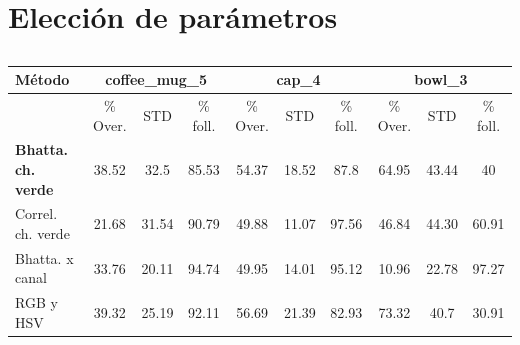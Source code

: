 \section{Elección de parámetros}\label{eleccion_parametros}
\begin{table}[h]
    \begin{tabular}{|l|*{3}{c|}*{3}{c|}*{3}{c|}}
        \hline 
	    Método & \multicolumn{3}{|c|}{coffee\_mug\_5} & \multicolumn{3}{|c|}{cap\_4} & \multicolumn{3}{|c|}{bowl\_3}\\
	    \hline 
         & \% Over. & STD & \% foll. & \% Over. & STD & \% foll. & \% Over. & STD & \% foll. \\
        \hline
        \textbf{Bhatta. ch. verde} & 38.52 & 32.5 & 85.53 & 54.37 & 18.52 & 87.8 & 64.95 & 43.44 & 40\\
        \hline
        	Correl. ch. verde & 21.68 & 31.54 & 90.79 & 49.88 & 11.07 & 97.56 & 46.84 & 44.30 & 60.91\\
	    \hline
	    Bhatta. x canal & 33.76 & 20.11 & 94.74 & 49.95 & 14.01 & 95.12 & 10.96 & 22.78 & 97.27\\
	    \hline
	    RGB y HSV & 39.32 & 25.19 & 92.11 & 56.69 & 21.39 & 82.93 & 73.32 & 40.7 & 30.91\\
	    \hline
    \end{tabular}
	\caption{}
\end{table}


